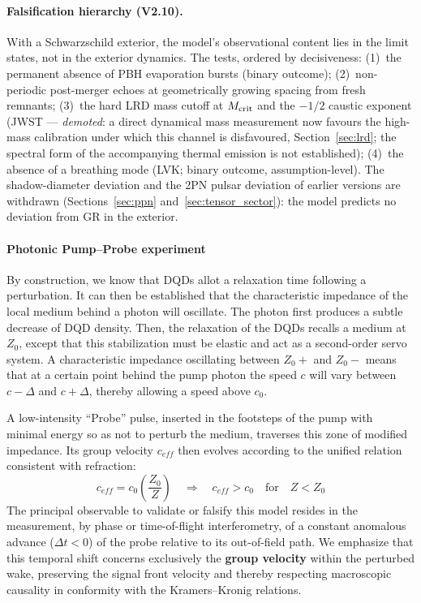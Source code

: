 \documentclass[11pt,a4paper]{article}
\theoremstyle{plain}
\theoremstyle{remark}
\begin{document}
\paragraph{Falsification hierarchy (V2.10).} With a Schwarzschild exterior, the model's observational content lies in the limit states, not in the exterior dynamics. The tests, ordered by decisiveness: (1)~the permanent absence of PBH evaporation bursts (binary outcome); (2)~non-periodic post-merger echoes at geometrically growing spacing from fresh remnants; (3)~the hard LRD mass cutoff at $M_{\rm crit}$ and the $-1/2$ caustic exponent (JWST --- \emph{demoted}: a direct dynamical mass measurement now favours the high-mass calibration under which this channel is disfavoured, Section~\ref{sec:lrd}; the spectral form of the accompanying thermal emission is not established); (4)~the absence of a breathing mode (LVK; binary outcome, assumption-level). The shadow-diameter deviation and the 2PN pulsar deviation of earlier versions are withdrawn (Sections~\ref{sec:ppn} and~\ref{sec:tensor_sector}): the model predicts no deviation from GR in the exterior.

\paragraph{Photonic Pump--Probe experiment}
By construction, we know that DQDs allot a relaxation time following a perturbation. It can then be established that the characteristic impedance of the local medium behind a photon will oscillate. The photon first produces a subtle decrease of DQD density. Then, the relaxation of the DQDs recalls a medium at $Z_0$, except that this stabilization must be elastic and act as a second-order servo system. A characteristic impedance oscillating between $Z_0+$ and $Z_0-$ means that at a certain point behind the pump photon the speed $c$ will vary between $c-\Delta$ and $c+\Delta$, thereby allowing a speed above $c_0$.

A low-intensity ``Probe'' pulse, inserted in the footsteps of the pump with minimal energy so as not to perturb the medium, traverses this zone of modified impedance. Its group velocity $c_{eff}$ then evolves according to the unified relation consistent with refraction:
\begin{equation}
c_{eff} = c_{0}\left(\frac{Z_{0}}{Z}\right) \quad \Rightarrow \quad c_{eff} > c_{0} \quad \text{for} \quad Z < Z_{0}
\end{equation}
The principal observable to validate or falsify this model resides in the measurement, by phase or time-of-flight interferometry, of a constant anomalous advance ($\Delta t < 0$) of the probe relative to its out-of-field path. We emphasize that this temporal shift concerns exclusively the \textbf{group velocity} within the perturbed wake, preserving the signal front velocity and thereby respecting macroscopic causality in conformity with the Kramers--Kronig relations.
\end{document}

